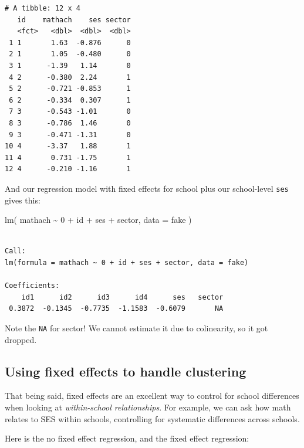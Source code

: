 \documentclass[
  letterpaper,
  DIV=11,
  numbers=noendperiod]{scrreprt}
\newenvironment{Shaded}{\begin{snugshade}}{\end{snugshade}}
\newcommand{\AttributeTok}[1]{\textcolor[rgb]{0.49,0.56,0.16}{#1}}
\newcommand{\DecValTok}[1]{\textcolor[rgb]{0.25,0.63,0.44}{#1}}
\newcommand{\FunctionTok}[1]{\textcolor[rgb]{0.02,0.16,0.49}{#1}}
\newcommand{\NormalTok}[1]{\textcolor[rgb]{0.00,0.44,0.13}{#1}}
\newcommand{\SpecialCharTok}[1]{\textcolor[rgb]{0.25,0.44,0.63}{#1}}
\begin{document}
\begin{verbatim}
# A tibble: 12 x 4
   id    mathach    ses sector
   <fct>   <dbl>  <dbl>  <dbl>
 1 1       1.63  -0.876      0
 2 1       1.05  -0.480      0
 3 1      -1.39   1.14       0
 4 2      -0.380  2.24       1
 5 2      -0.721 -0.853      1
 6 2      -0.334  0.307      1
 7 3      -0.543 -1.01       0
 8 3      -0.786  1.46       0
 9 3      -0.471 -1.31       0
10 4      -3.37   1.88       1
11 4       0.731 -1.75       1
12 4      -0.210 -1.16       1
\end{verbatim}

And our regression model with fixed effects for school plus our
school-level \texttt{ses} gives this:

\begin{Shaded}
\begin{Highlighting}[]
\FunctionTok{lm}\NormalTok{( mathach }\SpecialCharTok{\textasciitilde{}} \DecValTok{0} \SpecialCharTok{+}\NormalTok{ id }\SpecialCharTok{+}\NormalTok{ ses }\SpecialCharTok{+}\NormalTok{ sector, }\AttributeTok{data =}\NormalTok{ fake )}
\end{Highlighting}
\end{Shaded}

\begin{verbatim}

Call:
lm(formula = mathach ~ 0 + id + ses + sector, data = fake)

Coefficients:
    id1      id2      id3      id4      ses   sector  
 0.3872  -0.1345  -0.7735  -1.1583  -0.6079       NA  
\end{verbatim}

Note the \texttt{NA} for sector! We cannot estimate it due to
colinearity, so it got dropped.

\hypertarget{using-fixed-effects-to-handle-clustering}{%
\subsection{Using fixed effects to handle
clustering}\label{using-fixed-effects-to-handle-clustering}}

That being said, fixed effects are an excellent way to control for
school differences when looking at \emph{within-school relationships}.
For example, we can ask how math relates to SES within schools,
controlling for systematic differences across schools.

Here is the no fixed effect regression, and the fixed effect regression:
\end{document}

